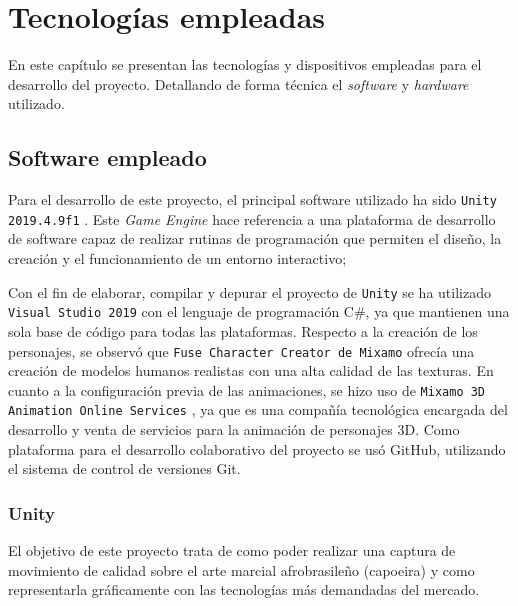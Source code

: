 
%
%

\chapter{Tecnologías empleadas}
\label{cap4:sec:capitulo4}

En este capítulo se presentan las tecnologías y dispositivos empleadas para el desarrollo del proyecto. Detallando de forma técnica el \textit{software} y \textit{hardware} utilizado.

\section{Software empleado}

Para el desarrollo de este proyecto, el principal software utilizado ha sido \texttt{Unity 2019.4.9f1} \cite{Unity_Manual}. Este \textit{Game Engine} hace referencia a una plataforma de desarrollo de software capaz de realizar rutinas de programación que permiten el diseño, la creación y el funcionamiento de un entorno interactivo;

Con el fin de elaborar, compilar y depurar el proyecto de \texttt{Unity} se ha utilizado \texttt{Visual Studio 2019} \cite{ VisualStudio} con el lenguaje de programación C\#, ya que mantienen una sola base de código para todas las plataformas. Respecto a la creación de los personajes, se observó que \texttt{Fuse Character Creator de Mixamo} \cite{FuseCharCreaMixamo} ofrecía una  creación de modelos humanos realistas con una alta calidad de las texturas. En cuanto a la configuración previa de las animaciones, se hizo uso de \texttt{Mixamo 3D Animation Online Services} \cite{Mixamo3DAnimation}, ya que es una compañía tecnológica encargada del desarrollo y venta de servicios para la animación de personajes 3D. Como plataforma para el desarrollo colaborativo del proyecto se usó GitHub, utilizando el sistema de control de versiones Git.

\subsection{Unity}

El objetivo de este proyecto trata de como poder realizar una captura de movimiento de calidad sobre el arte marcial afrobrasileño (capoeira) y como representarla gráficamente con las tecnologías más demandadas del mercado.

